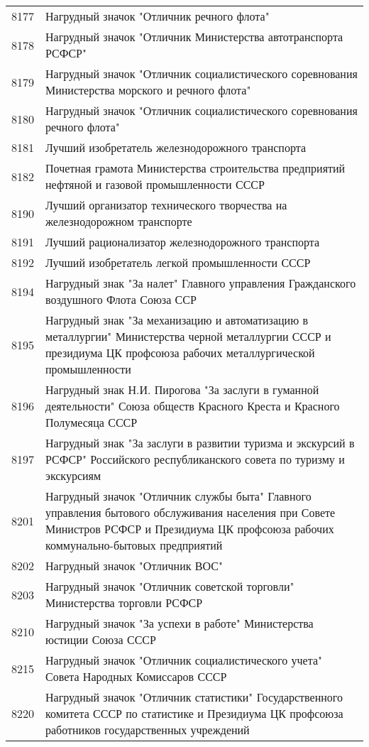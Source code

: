 \documentclass[10pt, a4paper, titlepage]{article}
\begin{document}
\begin{center}
\begin{longtable}{rp{}}
        8177 & Нагрудный значок "Отличник речного флота" \\
        8178 & Нагрудный значок "Отличник Министерства автотранспорта РСФСР" \\
        8179 & Нагрудный значок "Отличник социалистического соревнования Министерства морского и речного флота" \\
        8180 & Нагрудный значок "Отличник социалистического соревнования речного флота" \\
        8181 & Лучший изобретатель железнодорожного транспорта \\
        8182 & Почетная грамота Министерства строительства предприятий нефтяной и газовой промышленности СССР \\
        8190 & Лучший организатор технического творчества на железнодорожном транспорте \\
        8191 & Лучший рационализатор железнодорожного транспорта \\
        8192 & Лучший изобретатель легкой промышленности СССР \\
        8194 & Нагрудный знак "За налет" Главного управления Гражданского воздушного Флота Союза ССР \\
        8195 & Нагрудный знак "За механизацию и автоматизацию в металлургии" Министерства черной металлургии СССР и президиума ЦК профсоюза рабочих металлургической промышленности \\
        8196 & Нагрудный знак Н.И. Пирогова "За заслуги в гуманной деятельности" Союза обществ Красного Креста и Красного Полумесяца СССР \\
        8197 & Нагрудный знак "За заслуги в развитии туризма и экскурсий в РСФСР" Российского республиканского совета по туризму и экскурсиям \\
        8201 & Нагрудный значок "Отличник службы быта" Главного управления бытового обслуживания населения при Совете Министров РСФСР и Президиума ЦК профсоюза рабочих коммунально-бытовых предприятий \\
        8202 & Нагрудный значок "Отличник ВОС" \\
        8203 & Нагрудный значок "Отличник советской торговли" Министерства торговли РСФСР \\
        8210 & Нагрудный значок "За успехи в работе" Министерства юстиции Союза СССР \\
        8215 & Нагрудный значок "Отличник социалистического учета" Совета Народных Комиссаров СССР \\
        8220 & Нагрудный значок "Отличник статистики" Государственного комитета СССР по статистике и Президиума ЦК профсоюза работников государственных учреждений \\

\end{longtable}
\end{center}
\end{document}
